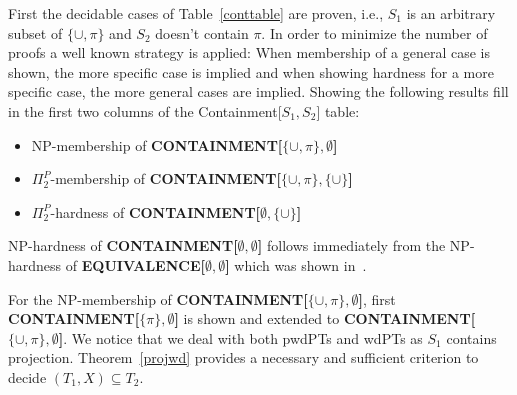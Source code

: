 First the decidable cases of Table~\ref{conttable} are proven, i.e., $S_1$ is an arbitrary subset of
$\{\cup,\pi\}$ and $S_2$ doesn't contain $\pi$. 
In order to minimize the number of proofs a well known strategy is applied: When membership of a
general case is shown, the more specific case is implied and when showing
hardness for a more specific case, the more general cases are implied.  
Showing the following results fill in the first two columns of the
Containment[$S_1,S_2$] table:
\begin{itemize}
	\item NP-membership of \textbf{CONTAINMENT[$\{\cup,\pi\},\emptyset$]}
	\item $\Pi^P_2$-membership of \textbf{CONTAINMENT[$\{\cup,\pi\},\{\cup\}$]}
	\item $\Pi^P_2$-hardness of \textbf{CONTAINMENT[$\emptyset,\{\cup\}$]}
\end{itemize}
NP-hardness of \textbf{CONTAINMENT[$\emptyset,\emptyset$]} follows immediately
from the NP-hardness of \textbf{EQUIVALENCE[$\emptyset,\emptyset$]} which was shown
in~\cite{letelier2013static}.

For the NP-membership of \textbf{CONTAINMENT[$\{\cup,\pi \}, \emptyset$]}, 
first \textbf{CONTAINMENT[$\{\pi\} , \emptyset$]} is shown and extended to 
\textbf{CONTAINMENT[$\{\cup,\pi \}, \emptyset$]}. We notice that we deal with
both pwdPTs and wdPTs as $S_1$ contains projection. Theorem~\ref{projwd} provides a
necessary and sufficient criterion to decide $(T_1,X) \subseteq T_2$.

